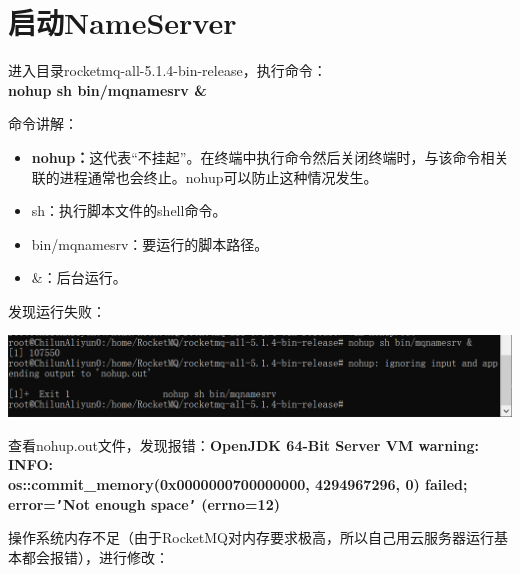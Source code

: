 \documentclass[11pt, a4paper, oneside]{ctexbook}
\let\kaishu\relax                               %
\begin{document}
\section{启动NameServer}
进入目录rocketmq-all-5.1.4-bin-release，执行命令：\\{\bfseries\kaishu nohup sh bin/mqnamesrv \&}

命令讲解：
\begin{itemize}
  \item {\bfseries\kaishu nohup：}这代表“不挂起”。在终端中执行命令然后关闭终端时，与该命令相关联的进程通常也会终止。nohup可以防止这种情况发生。
  \item sh：执行脚本文件的shell命令。
  \item bin/mqnamesrv：要运行的脚本路径。
  \item \&：后台运行。
\end{itemize}

发现运行失败：
\begin{center}
  \begin{minipage}{\textwidth}
    \center
    \includegraphics[width=\textwidth]{picture/名字服务器启动失败.png}
    \captionsetup{hypcap=false}
    \label{fig:名字服务器启动失败}
  \end{minipage}
\end{center}

查看nohup.out文件，发现报错：{\bfseries\kaishu OpenJDK 64-Bit Server VM warning: INFO: \\os::commit\_memory(0x0000000700000000, 4294967296, 0) failed; error=\texttt{'}Not enough space\texttt{'} (errno=12)}

操作系统内存不足（由于RocketMQ对内存要求极高，所以自己用云服务器运行基本都会报错），进行修改：
\end{document}
